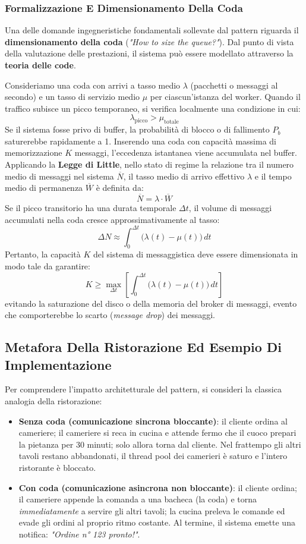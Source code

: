 \documentclass[11pt, a4paper]{article}
\begin{document}
\subsubsection{Formalizzazione E Dimensionamento Della Coda}

Una delle domande ingegneristiche fondamentali sollevate dal pattern riguarda il \textbf{dimensionamento della coda} (\emph{"How to size the queue?"}). Dal punto di vista della valutazione delle prestazioni, il sistema può essere modellato attraverso la \textbf{teoria delle code}.

Consideriamo una coda con arrivi a tasso medio $\lambda$ (pacchetti o messaggi al secondo) e un tasso di servizio medio $\mu$ per ciascun'istanza del worker. Quando il traffico subisce un picco temporaneo, si verifica localmente una condizione in cui:
\[
    \lambda_{\text{picco}} > \mu_{\text{totale}}
\]
Se il sistema fosse privo di buffer, la probabilità di blocco o di fallimento $P_b$ saturerebbe rapidamente a 1. Inserendo una coda con capacità massima di memorizzazione $K$ messaggi, l'eccedenza istantanea viene accumulata nel buffer. Applicando la \textbf{Legge di Little}, nello stato di regime la relazione tra il numero medio di messaggi nel sistema $\overline{N}$, il tasso medio di arrivo effettivo $\lambda$ e il tempo medio di permanenza $\overline{W}$ è definita da:
\[
    \boxed{\overline{N} = \lambda \cdot \overline{W}}
\]
Se il picco transitorio ha una durata temporale $\Delta t$, il volume di messaggi accumulati nella coda cresce approssimativamente al tasso:
\[
    \Delta N \approx \int_{0}^{\Delta t} \Big(\lambda(t) - \mu(t)\Big) \, dt
\]
Pertanto, la capacità $K$ del sistema di messaggistica deve essere dimensionata in modo tale da garantire:
\[
    K \ge \max_{\Delta t} \left[ \int_{0}^{\Delta t} \Big(\lambda(t) - \mu(t)\Big) \, dt \right]
\]
evitando la saturazione del disco o della memoria del broker di messaggi, evento che comporterebbe lo scarto (\emph{message drop}) dei messaggi.

\subsection{Metafora Della Ristorazione Ed Esempio Di Implementazione}

Per comprendere l'impatto architetturale del pattern, si consideri la classica analogia della ristorazione:
\begin{itemize}[noitemsep]
    \item \textbf{Senza coda (comunicazione sincrona bloccante)}: il cliente ordina al cameriere; il cameriere si reca in cucina e attende fermo che il cuoco prepari la pietanza per 30 minuti; solo allora torna dal cliente. Nel frattempo gli altri tavoli restano abbandonati, il thread pool dei camerieri è saturo e l'intero ristorante è bloccato.
    \item \textbf{Con coda (comunicazione asincrona non bloccante)}: il cliente ordina; il cameriere appende la comanda a una bacheca (la coda) e torna \emph{immediatamente} a servire gli altri tavoli; la cucina preleva le comande ed evade gli ordini al proprio ritmo costante. Al termine, il sistema emette una notifica: \emph{"Ordine n° 123 pronto!"}.
\end{itemize}
\end{document}
